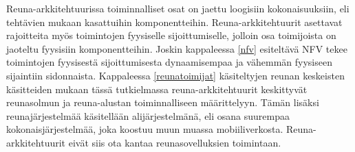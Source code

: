 Reuna-arkkitehtuurissa toiminnalliset osat on jaettu loogisiin kokonaisuuksiin, eli tehtävien mukaan kasattuihin komponentteihin. Reuna-arkkitehtuurit asettavat rajoitteita myös toimintojen fyysiselle sijoittumiselle, jolloin osa toimijoista on jaoteltu fyysisiin komponentteihin. Joskin kappaleessa \ref{nfv} esiteltävä NFV tekee toimintojen fyysisestä sijoittumisesta dynaamisempaa ja vähemmän fyysiseen sijaintiin sidonnaista. 
Kappaleessa \ref{reunatoimijat} käsiteltyjen reunan keskeisten käsitteiden mukaan tässä tutkielmassa reuna-arkkitehtuurit keskittyvät reunasolmun ja reuna-alustan toiminnalliseen määrittelyyn. 
Tämän lisäksi reunajärjestelmää käsitellään alijärjestelmänä, eli osana suurempaa kokonaisjärjestelmää, joka koostuu muun muassa mobiiliverkosta.
Reuna-arkkitehtuurit eivät siis ota kantaa reunasovelluksien toimintaan.



